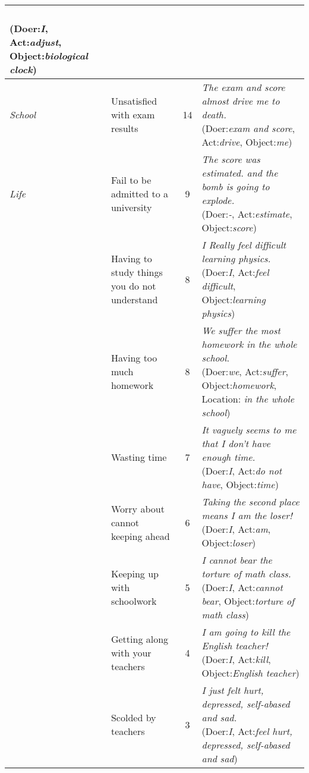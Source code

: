 \begin{table*}
\begin{center}
\begin{footnotesize}
\begin{tabular}{llcl}
{\\(Doer:\emph{I}, Act:\emph{adjust}, Object:\emph{biological clock})}\\ \hline
\emph{School}&	Unsatisfied with exam results	&	14	&
\tabincell{l}{\emph{The exam and score almost drive me to death.}
\\(Doer:\emph{exam and score}, Act:\emph{drive}, Object:\emph{me})}\\ \cline{2-4}
\emph{Life}	&	Fail to be admitted to a university	&	9	&
\tabincell{l}{\emph{The score was estimated. and the bomb is going to explode.}
\\(Doer:\emph{-}, Act:\emph{estimate}, Object:\emph{score})}\\ \cline{2-4}
&	Having to study things you do not understand	&	8	&
\tabincell{l}{\emph{I Really feel difficult learning physics.}
\\(Doer:\emph{I}, Act:\emph{feel difficult}, Object:\emph{learning physics})}\\ \cline{2-4}
&	Having too much homework	&	8	&
\tabincell{l}{\emph{We suffer the most homework in the whole school.}
\\(Doer:\emph{we}, Act:\emph{suffer}, Object:\emph{homework}, Location: \emph{in the whole school})}\\ \cline{2-4}
&	Wasting time	&	7	&
\tabincell{l}{\emph{It vaguely seems to me that I don't have enough time.}
\\(Doer:\emph{I}, Act:\emph{do not have}, Object:\emph{time})}\\ \cline{2-4}
&	Worry about cannot keeping ahead	&	6	&
\tabincell{l}{\emph{Taking the second place means I am the loser!}
\\(Doer:\emph{I}, Act:\emph{am}, Object:\emph{loser})}\\ \cline{2-4}
&	Keeping up with schoolwork	&	5	&
\tabincell{l}{\emph{I cannot bear the torture of math class.}
\\(Doer:\emph{I}, Act:\emph{cannot bear}, Object:\emph{torture of math class})}\\ \cline{2-4}
&	Getting along with your teachers	&	4	&
\tabincell{l}{\emph{I am going to kill the English teacher!}
\\(Doer:\emph{I}, Act:\emph{kill}, Object:\emph{English teacher})}\\ \cline{2-4}
&	Scolded by teachers	&	3	&
\tabincell{l}{\emph{I just felt hurt, depressed, self-abased and sad.}
\\(Doer:\emph{I}, Act:\emph{feel hurt, depressed, self-abased and sad})}\\ \cline{2-4}

\end{tabular}
\end{footnotesize}
\end{center}
\end{table*}
